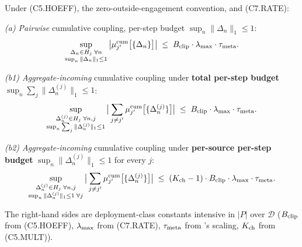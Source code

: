 \begin{lemma}
\label{lem:cumulative-companion}
Under (C5.HOEFF), the zero-outside-engagement convention, and
(C7.RATE):

\emph{(a) Pairwise} cumulative coupling, per-step budget
$\sup_n \|\Delta_n\|_1 \leq 1$:
\begin{equation}
\label{eq:pairwise-cum-companion}
  \sup_{\substack{\Delta_n \in H_j \;\forall n \\
        \sup_n \|\Delta_n\|_1 \leq 1}}
  \big| \mu_{j'}^{\mathrm{cum}}\big[\{\Delta_n\}\big] \big|
  \;\leq\; B_{\mathrm{clip}} \cdot \lambda_{\max} \cdot \tau_{\mathrm{meta}}.
\end{equation}

\emph{(b1) Aggregate-incoming} cumulative coupling under
\textbf{total per-step budget} $\sup_n \sum_j \|\Delta_n^{(j)}\|_1
\leq 1$:
\begin{equation}
\label{eq:aggregate-total-companion}
  \sup_{\substack{\Delta_n^{(j)} \in H_j \;\forall n, j \\
    \sup_n \sum_j \|\Delta_n^{(j)}\|_1 \leq 1}}
  \big| \sum_{j \neq j'}
    \mu_{j'}^{\mathrm{cum}}\big[\{\Delta_n^{(j)}\}\big] \big|
  \;\leq\; B_{\mathrm{clip}} \cdot \lambda_{\max} \cdot \tau_{\mathrm{meta}}.
\end{equation}

\emph{(b2) Aggregate-incoming} cumulative coupling under
\textbf{per-source per-step budget} $\sup_n
\|\Delta_n^{(j)}\|_1 \leq 1$ for every $j$:
\begin{equation}
\label{eq:aggregate-source-companion}
  \sup_{\substack{\Delta_n^{(j)} \in H_j \;\forall n, j \\
    \sup_n \|\Delta_n^{(j)}\|_1 \leq 1 \;\forall j}}
  \big| \sum_{j \neq j'}
    \mu_{j'}^{\mathrm{cum}}\big[\{\Delta_n^{(j)}\}\big] \big|
  \;\leq\; (K_{\mathrm{ch}} - 1) \cdot B_{\mathrm{clip}} \cdot \lambda_{\max} \cdot \tau_{\mathrm{meta}}.
\end{equation}

The right-hand sides are deployment-class constants intensive in
$|P|$ over $\mathcal{D}$ ($B_{\mathrm{clip}}$ from (C5.HOEFF), $\lambda_{\max}$
from (C7.RATE), $\tau_{\mathrm{meta}}$ from
\citep[Phase Redundancy]{lasser2026phase}'s scaling, $K_{\mathrm{ch}}$ from
(C5.MULT)).
\end{lemma}

